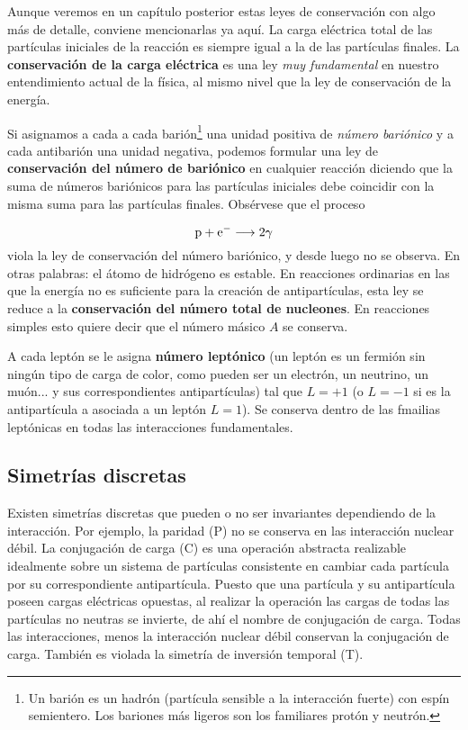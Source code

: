 Aunque veremos en un capítulo posterior estas leyes de conservación con algo más de detalle, conviene mencionarlas ya aquí. La carga eléctrica total de las partículas iniciales de la reacción es siempre igual a la de las partículas finales. La \textbf{conservación de la carga eléctrica} es una ley \textit{muy fundamental} en nuestro entendimiento actual de la física, al mismo nivel que la ley de conservación de la energía.


Si asignamos a cada a cada barión\footnote{Un barión es un hadrón (partícula sensible a la interacción fuerte) con espín semientero. Los bariones más ligeros son los familiares protón y neutrón.} una unidad positiva de \textit{número bariónico} y a cada antibarión una unidad negativa, podemos formular una ley de \textbf{conservación del número de bariónico} en cualquier reacción diciendo que la suma de números bariónicos para las partículas iniciales debe coincidir con la misma suma para las partículas finales. Obsérvese que el proceso 
 
\begin{equation}
    \text{p} + \text{e}^- \longrightarrow  2 \gamma
\end{equation}
viola la ley de conservación del número bariónico, y desde luego no se observa. En otras palabras: el átomo de hidrógeno es estable. En reacciones ordinarias en las que la energía no es suficiente para la creación de antipartículas, esta ley se reduce a la \textbf{conservación del número total de nucleones}. En reacciones simples esto quiere decir que el número másico $A$ se conserva.


A cada leptón se le asigna \textbf{número leptónico} (un leptón es un fermión sin ningún tipo de carga de color, como pueden ser un electrón, un neutrino, un muón... y sus correspondientes antipartículas) tal que $L=+1$ (o $L=-1$ si es la antipartícula a asociada a un leptón $L=1$). Se conserva dentro de las fmailias leptónicas en todas las interacciones fundamentales.

\subsection{Simetrías discretas}

Existen simetrías discretas que pueden o no ser invariantes dependiendo de la interacción. Por ejemplo, la paridad (P) no se conserva en las interacción nuclear débil. La conjugación de carga (C) es una operación abstracta realizable idealmente sobre un sistema de partículas consistente en cambiar cada partícula por su correspondiente antipartícula. Puesto que una partícula y su antipartícula poseen cargas eléctricas opuestas, al realizar la operación las cargas de todas las partículas no neutras se invierte, de ahí el nombre de conjugación de carga. Todas las interacciones, menos la interacción nuclear débil conservan la conjugación de carga. También es violada la simetría de inversión temporal (T).

